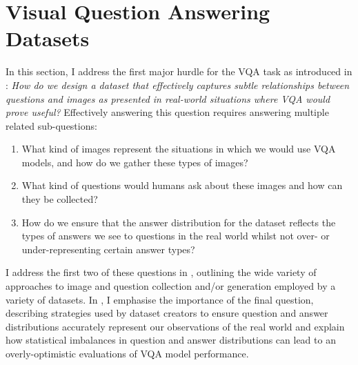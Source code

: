 



\section{Visual Question Answering Datasets}
\label{section:vqa_datasets}

In this section, I address the first major hurdle for the VQA task as introduced in \chapterautorefname{  \ref{chapter:introduction}}: \textit{How do we design a dataset that effectively captures subtle relationships between questions and images as presented in real-world situations where VQA would prove useful?} Effectively answering this question requires answering multiple related sub-questions:

\begin{enumerate}
    \item What kind of images represent the situations in which we would use VQA models, and how do we gather these types of images?
    \item What kind of questions would humans ask about these images and how can they be collected?
    \item How do we ensure that the answer distribution for the dataset reflects the types of answers we see to questions in the real world whilst not over- or under-representing certain answer types?
\end{enumerate}

I address the first two of these questions in \subsectionautorefname{ \ref{subsection:question_and_image_collection}}, outlining the wide variety of approaches to image and question collection and/or generation employed by a variety of datasets. In \subsectionautorefname{ \ref{subsec:lanauge_priors_in_vqa_datasets}}, I emphasise the importance of the final question, describing strategies used by dataset creators to ensure question and answer distributions accurately represent our observations of the real world and explain how statistical imbalances in question and answer distributions can lead to an overly-optimistic evaluations of VQA model performance.

